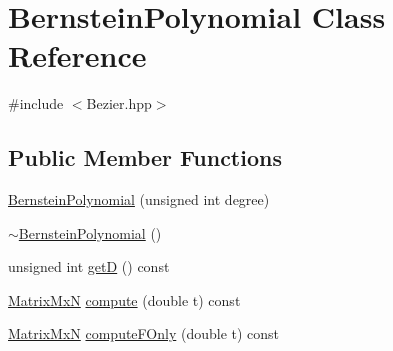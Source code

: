 \hypertarget{class_bernstein_polynomial}{\section{Bernstein\-Polynomial Class Reference}
\label{class_bernstein_polynomial}
}


{\ttfamily \#include $<$Bezier.\-hpp$>$}

\subsection*{Public Member Functions}
\begin{DoxyCompactItemize}
\item 
\hyperlink{class_bernstein_polynomial_a518fdef975c92857e34fa17077b0351a}{Bernstein\-Polynomial} (unsigned int degree)
\item 
\hyperlink{class_bernstein_polynomial_a9b74fd40365e53a1a0fd7de30d688ce0}{$\sim$\-Bernstein\-Polynomial} ()
\item 
unsigned int \hyperlink{class_bernstein_polynomial_af121be73ab75d393d0344311810a9f66}{get\-D} () const 
\item 
\hyperlink{class_matrix_mx_n}{Matrix\-Mx\-N} \hyperlink{class_bernstein_polynomial_ae4dc99cf3e2ea03671ca459dffa02314}{compute} (double t) const 
\item 
\hyperlink{class_matrix_mx_n}{Matrix\-Mx\-N} \hyperlink{class_bernstein_polynomial_a0f7c4c41e6c7d6258eac0ca090a621ea}{compute\-F\-Only} (double t) const 
\end{DoxyCompactItemize}


